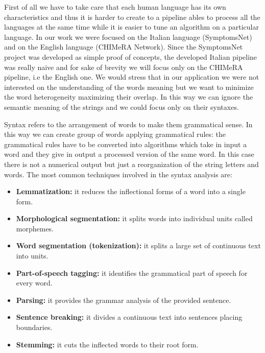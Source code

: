 \documentclass{standalone}
\begin{document}
First of all we have to take care that each human language has its own characteristics and thus it is harder to create to a pipeline ables to process all the languages at the same time while it is easier to tune an algorithm on a particular language.
In our work we were focused on the Italian language (SymptomsNet) and on the English language (CHIMeRA Network).
Since the SymptomsNet project was developed as simple proof of concepts, the developed Italian pipeline was really naive and for sake of brevity we will focus only on the CHIMeRA pipeline, i.e the English one.
We would stress that in our application we were not interested on the understanding of the words meaning but we want to minimize the word heterogeneity maximizing their overlap.
In this way we can ignore the semantic meaning of the strings and we could focus only on their syntaxes.

Syntax refers to the arrangement of words to make them grammatical sense.
In this way we can create group of words applying grammatical rules: the grammatical rules have to be converted into algorithms which take in input a word and they give in output a processed version of the same word.
In this case there is not a numerical output but just a reorganization of the string letters and words.
The most common techniques involved in the syntax analysis are:

\begin{itemize}

  \item \textbf{Lemmatization:} it reduces the inflectional forms of a word into a single form.
  \item \textbf{Morphological segmentation:} it splits words into individual units called morphemes.
  \item \textbf{Word segmentation (tokenization):} it splits a large set of continuous text into units.
  \item \textbf{Part-of-speech tagging:} it identifies the grammatical part of speech for every word.
  \item \textbf{Parsing:} it provides the grammar analysis of the provided sentence.
  \item \textbf{Sentence breaking:} it divides a continuous text into sentences placing boundaries.
  \item \textbf{Stemming:} it cuts the inflected words to their root form.

\end{itemize}
\end{document}
